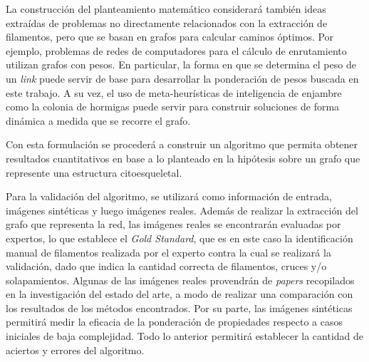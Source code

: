\documentclass{article}
\begin{document}
La construcci\'on del planteamiento matem\'atico considerar\'a tambi\'en ideas extra\'idas de problemas no directamente relacionados con la extracci\'on de filamentos, pero que se basan en grafos para calcular caminos \'optimos. Por ejemplo, problemas de redes de computadores para el c\'alculo de enrutamiento utilizan grafos con pesos. En particular, la forma en que se determina el peso de un {\it link} puede servir de base para desarrollar la ponderaci\'on de pesos buscada en este trabajo. 
A su vez, el uso de meta-heur\'isticas de inteligencia de enjambre como la colonia de hormigas puede servir para construir soluciones de forma din\'amica a medida que se recorre el grafo.

Con esta formulaci\'on se proceder\'a a construir un algoritmo que permita obtener resultados cuantitativos en base a lo planteado en la hip\'otesis sobre un grafo que represente una estructura citoesqueletal. 


Para la validaci\'on del algoritmo, se utilizar\'a como informaci\'on de entrada, im\'agenes sint\'eticas y luego im\'agenes reales. Adem\'as de realizar la extracci\'on del grafo que representa la red, las im\'agenes reales se encontrar\'an evaluadas por expertos, lo que establece el \textit{Gold Standard}, que es en este caso la identificaci\'on manual de filamentos realizada por el experto contra la cual se realizar\'a la validaci\'on, dado que indica la cantidad correcta de filamentos, cruces y/o solapamientos.
Algunas de las im\'agenes reales provendr\'an de {\it papers} recopilados en la investigaci\'on del estado del arte, a modo de realizar una comparaci\'on con los resultados de los m\'etodos encontrados. Por su parte, las im\'agenes sint\'eticas permitir\'a medir la eficacia de la ponderaci\'on de propiedades respecto a casos iniciales de baja complejidad. Todo lo anterior permitir\'a establecer la cantidad de aciertos y errores del algoritmo.




\end{document}
